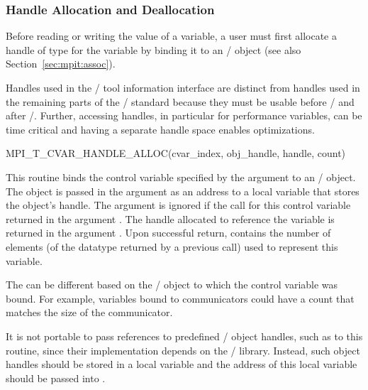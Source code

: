 \subsubsection{Handle Allocation and Deallocation}

Before reading or writing the value of a variable, a user must first
allocate a handle of type
 for the
variable by binding it to an \MPI/ object (see also
Section~\ref{sec:mpit:assoc}).

\begin{rationale}
Handles used in the \MPI/ tool information interface are distinct from
handles used in the remaining parts of the \MPI/ standard because they must
be usable before \MPIisinitialized/ and after \MPIisfinalized/.
Further, accessing handles, in particular for performance variables, can be
time critical and having a separate handle space enables optimizations.
\end{rationale}

\begin{funcdef}{MPI\_T\_CVAR\_HANDLE\_ALLOC}{(\mbox{cvar\_index}, \mbox{obj\_handle}, \mbox{handle}, \mbox{count})}
\end{funcdef}

This routine binds the control variable specified by the argument
 to an \MPI/ object.  The object is passed in the
argument  as an address to a local variable that
stores the object's handle.  The argument  is ignored
if the  call for this control variable
returned  in the argument
.  The handle allocated to reference the variable is
returned in the argument .  Upon successful return,
 contains the number of elements (of the datatype
returned by a previous  call) used to
represent this variable.

\begin{users}
The  can be different based on the \MPI/ object to which the
control variable was bound.  For example, variables bound to communicators
could have a count that matches the size of the communicator.

It is not portable to pass references to predefined \MPI/ object handles,
such as  to this routine, since their
implementation depends on the \MPI/ library.  Instead, such object handles
should be stored in a local variable and the address of this local variable
should be passed into .
\end{users}

